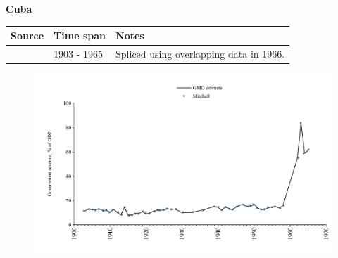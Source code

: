 \documentclass[12pt,a4paper,landscape]{article}
\begin{document}
\begin{adjustbox}{max totalsize={\paperwidth}{\paperheight},center}
\begin{minipage}[t][\textheight][t]{\textwidth}
\vspace*{0.5cm}
{}
\begin{center}
{\Large\bfseries Cuba}
\end{center}
\vspace{0.5cm}
\begin{table}[H]
\centering
\small
\begin{tabular}{|l|l|l|}
\hline
\textbf{Source} & \textbf{Time span} & \textbf{Notes} \\
\hline
\rowcolor{white}\cite{Mitchell}& 1903 - 1965 &Spliced using overlapping data in 1966.\\
\hline
\end{tabular}
\end{table}
\begin{figure}[H]
\centering
\includegraphics[width=\textwidth,height=0.6\textheight,keepaspectratio]{graphs/CUB_govrev_GDP.pdf}
\end{figure}
\end{minipage}
\end{adjustbox}
\end{document}
